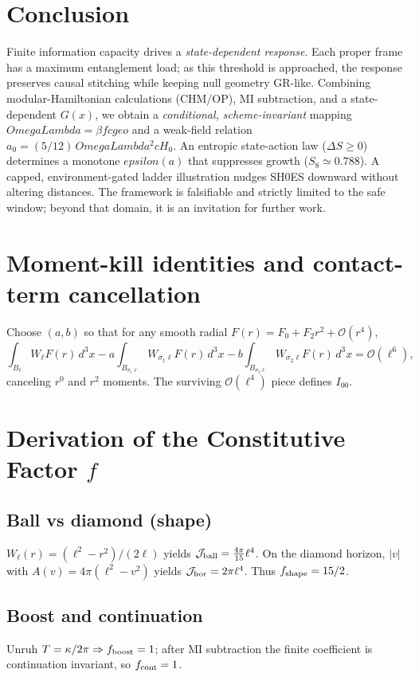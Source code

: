 \documentclass[aps,prd,onecolumn,superscriptaddress,nofootinbib]{revtex4-2}
\def\OmL{OmegaLambda}%
\def\cgeo{cgeo}%
\def\eps{epsilon}%
\newcommand{\OmL}{\Omega_\Lambda}
\newcommand{\cgeo}{c_{\rm geo}}
\newcommand{\eps}{\varepsilon}
\begin{document}
\section{Conclusion}
Finite information capacity drives a \emph{state-dependent response}. Each proper frame has a maximum entanglement load; as this threshold is approached, the response preserves causal stitching while keeping null geometry GR-like. Combining modular-Hamiltonian calculations (CHM/OP), MI subtraction, and a state-dependent $G(x)$, we obtain a \emph{conditional, scheme-invariant} mapping $\OmL=\beta f \cgeo$ and a weak-field relation $a_0=(5/12)\,\OmL^2 cH_0$. An entropic state-action law ($\Delta S\ge 0$) determines a monotone $\eps(a)$ that suppresses growth ($S_8\simeq 0.788$). A capped, environment-gated ladder illustration nudges SH0ES downward without altering distances. The framework is falsifiable and strictly limited to the safe window; beyond that domain, it is an invitation for further work.

\appendix

\section{Moment-kill identities and contact-term cancellation}
\label{app:MI-momentkill}
Choose $(a,b)$ so that for any smooth radial $F(r)=F_0+F_2 r^2+\mathcal O(r^4)$,
\begin{equation}
\int_{B_\ell}\!W_\ell F(r)\,d^3x - a\!\int_{B_{\sigma_1\ell}}\!W_{\sigma_1\ell}F(r)\,d^3x - b\!\int_{B_{\sigma_2\ell}}\!W_{\sigma_2\ell}F(r)\,d^3x = \mathcal O(\ell^6),
\end{equation}
canceling $r^0$ and $r^2$ moments. The surviving $\mathcal O(\ell^4)$ piece defines $I_{00}$.

\section{Derivation of the Constitutive Factor $f$}
\label{app:f-normalization}
\subsection{Ball vs diamond (shape)}
$W_\ell(r)=(\ell^2-r^2)/(2\ell)$ yields $\mathcal J_{\rm ball}=\frac{4\pi}{15}\ell^4$.
On the diamond horizon, $|v|$ with $A(v)=4\pi(\ell^2-v^2)$ yields $\mathcal J_{\rm hor}=2\pi\ell^4$.
Thus $f_{\rm shape}=15/2$.

\subsection{Boost and continuation}
Unruh $T=\kappa/2\pi\Rightarrow f_{\rm boost}=1$; after MI subtraction the finite coefficient is continuation invariant, so $f_{\rm cont}=1$.
\end{document}
